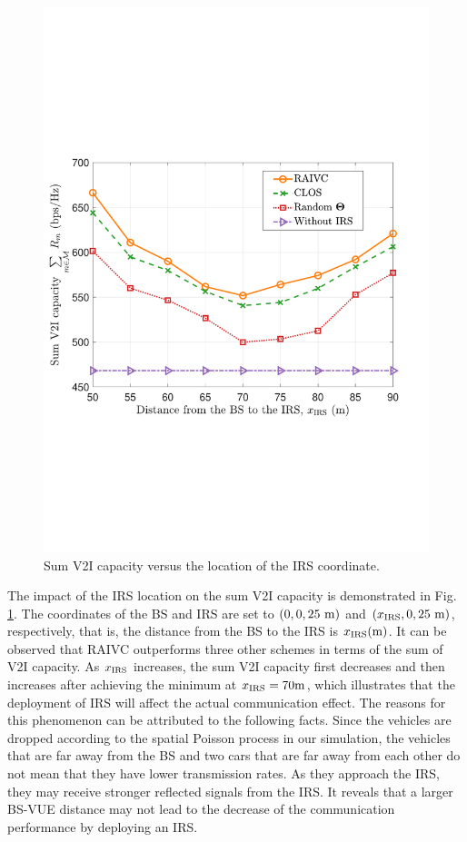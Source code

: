 \documentclass[journal]{IEEEtran}
\begin{document}
\begin{figure}[t]
	\centering
	\includegraphics[width=0.8\linewidth]{Fig4.pdf}%
	\caption{Sum V2I capacity versus the location of the IRS coordinate.}\label{Fig4}
\end{figure}

The impact of the IRS location on the sum V2I capacity is demonstrated in Fig. \ref{Fig4}. The coordinates of the BS and IRS are set to $ \left( {0,0,25\ {\rm{m}}} \right) $ and $ \left( {{x_{{\rm{IRS}}}},0,25\ {\rm{m}}} \right) $, respectively, that is, the distance from the BS to the IRS is $ {{x_{{\rm{IRS}}}}\rm{(m)}} $. It can be observed that RAIVC outperforms three other schemes in terms of the sum of V2I capacity. As $ {x_{{\rm{IRS}}}} $ increases, the sum V2I capacity first decreases and then increases after achieving the minimum at $ {x_{{\rm{IRS}}}} = 70{\rm{m}} $, which illustrates that the deployment of IRS will affect the actual communication effect. The reasons for this phenomenon can be attributed to the following facts. Since the vehicles are dropped according to the spatial Poisson process in our simulation, the vehicles that are far away from the BS and two cars that are far away from each other do not mean that they have lower transmission rates. As they approach the IRS, they may receive stronger reflected signals from the IRS. It reveals that a larger BS-VUE distance may not lead to the decrease of the communication performance by deploying an IRS.
\end{document}
